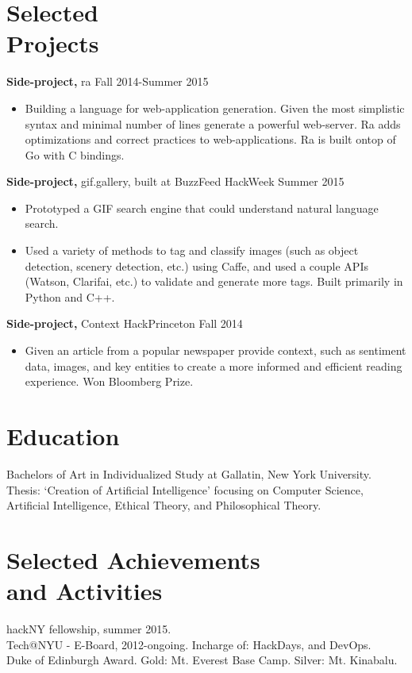 \documentclass[margin]{res}
\begin{document}
\begin{resume}
\section{Selected \\ Projects}
{\bf Side-project,} ra \hfill Fall 2014-Summer 2015
\begin{itemize} \itemsep -2pt
\item Building a language for web-application generation. Given the most simplistic syntax and minimal number of lines generate a powerful web-server. Ra adds optimizations and correct practices to web-applications. Ra is built ontop of Go with C bindings.
\end{itemize}

{\bf Side-project,} gif.gallery, built at BuzzFeed HackWeek \hfill Summer 2015
\begin{itemize} \itemsep -2pt
\item Prototyped a GIF search engine that could understand natural language search. 
\item Used a variety of methods to tag and classify images (such as object detection, scenery detection, etc.) using Caffe, and used a couple APIs (Watson, Clarifai, etc.) to validate and generate more tags. Built primarily in Python and C++.
\end{itemize}

{\bf Side-project,} Context \hfill HackPrinceton Fall 2014
\begin{itemize} \itemsep -2pt 
\item Given an article from a popular newspaper provide context, such as sentiment data, images, and key entities to create a more informed and efficient reading experience. Won Bloomberg Prize.
\end{itemize}

\section{Education} 
Bachelors of Art in Individualized Study at Gallatin, New York University. \\
Thesis: `Creation of Artificial Intelligence' focusing on Computer Science, Artificial Intelligence, Ethical Theory, and Philosophical Theory.

\section{Selected Achievements \\ and Activities} 
hackNY fellowship, summer 2015. \\
Tech@NYU - E-Board, 2012-ongoing. Incharge of: HackDays, and DevOps. \\
Duke of Edinburgh Award. Gold: Mt. Everest Base Camp. Silver: Mt. Kinabalu.

\end{resume} 
\end{document}
